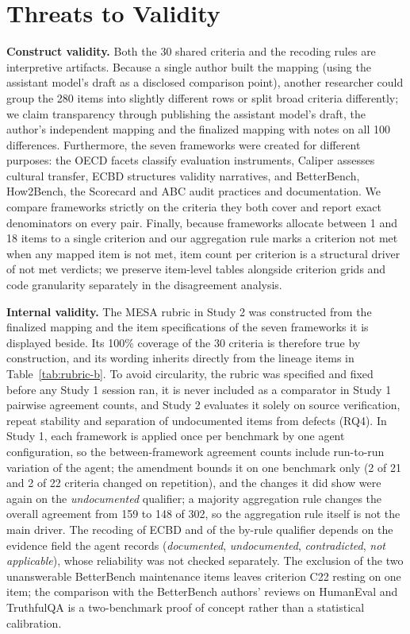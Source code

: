 \documentclass[10pt,conference]{IEEEtran}
\begin{document}
\section{Threats to Validity}
\textbf{Construct validity.} Both the 30 shared criteria and the recoding rules are interpretive artifacts. Because a single author built the mapping (using the assistant model's draft as a disclosed comparison point), another researcher could group the 280 items into slightly different rows or split broad criteria differently; we claim transparency through publishing the assistant model's draft, the author's independent mapping and the finalized mapping with notes on all 100 differences. Furthermore, the seven frameworks were created for different purposes: the OECD facets classify evaluation instruments, Caliper assesses cultural transfer, ECBD structures validity narratives, and BetterBench, How2Bench, the Scorecard and ABC audit practices and documentation. We compare frameworks strictly on the criteria they both cover and report exact denominators on every pair. Finally, because frameworks allocate between 1 and 18 items to a single criterion and our aggregation rule marks a criterion not met when any mapped item is not met, item count per criterion is a structural driver of not met verdicts; we preserve item-level tables alongside criterion grids and code granularity separately in the disagreement analysis.

\textbf{Internal validity.} The MESA rubric in Study 2 was constructed from the finalized mapping and the item specifications of the seven frameworks it is displayed beside. Its 100\% coverage of the 30 criteria is therefore true by construction, and its wording inherits directly from the lineage items in Table~\ref{tab:rubric-b}. To avoid circularity, the rubric was specified and fixed before any Study 1 session ran, it is never included as a comparator in Study 1 pairwise agreement counts, and Study 2 evaluates it solely on source verification, repeat stability and separation of undocumented items from defects (RQ4). In Study 1, each framework is applied once per benchmark by one agent configuration, so the between-framework agreement counts include run-to-run variation of the agent; the amendment bounds it on one benchmark only (2 of 21 and 2 of 22 criteria changed on repetition), and the changes it did show were again on the \emph{undocumented} qualifier; a majority aggregation rule changes the overall agreement from 159 to 148 of 302, so the aggregation rule itself is not the main driver. The recoding of ECBD and of the by-rule qualifier depends on the evidence field the agent records (\emph{documented}, \emph{undocumented}, \emph{contradicted}, \emph{not applicable}), whose reliability was not checked separately. The exclusion of the two unanswerable BetterBench maintenance items leaves criterion C22 resting on one item; the comparison with the BetterBench authors' reviews on HumanEval and TruthfulQA is a two-benchmark proof of concept rather than a statistical calibration.
\end{document}
